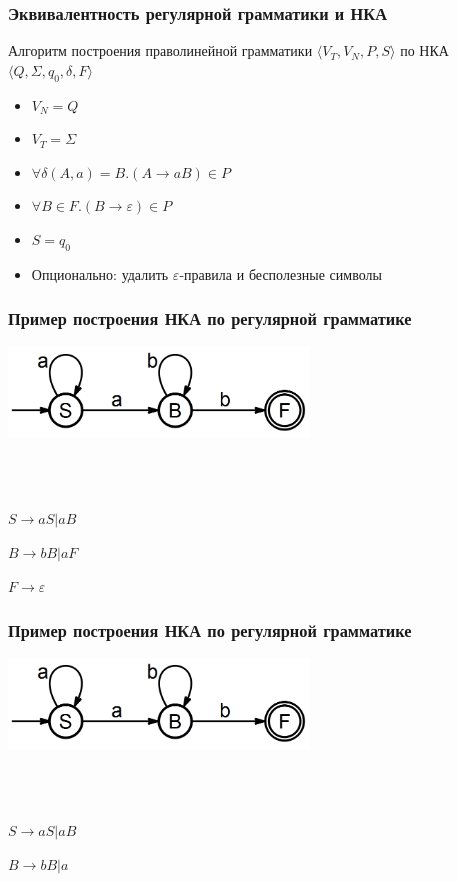 \documentclass{beamer}
\begin{document}
\begin{frame}[fragile]
  \transwipe[direction=90]
  \frametitle{Эквивалентность регулярной грамматики и НКА}
  Алгоритм построения праволинейной грамматики $\langle V_T, V_N, P, S \rangle$ по НКА $\langle Q, \Sigma, q_0, \delta, F \rangle$
  \begin{itemize}
    \item $V_N = Q$
    \item $V_T = \Sigma$
    \item $\forall \delta(A, a) = B . (A \rightarrow a B) \in P$
    \item $\forall B \in F. (B \rightarrow \varepsilon) \in P$
    \item $S = q_0$
    \item Опционально: удалить $\varepsilon$-правила и бесполезные символы
  \end{itemize}
\end{frame}

\begin{frame}[fragile]
  \transwipe[direction=90]
  \frametitle{Пример построения НКА по регулярной грамматике}
  \begin{center}
  \includegraphics[width=0.60\textwidth]{pics/rg_nfa.png} 
  \end{center}
  
  ~\\~
  
   $S \rightarrow aS | aB$
  
  $B \rightarrow bB | aF$
  
  $F \rightarrow \varepsilon$
\end{frame}

\begin{frame}[fragile]
  \transwipe[direction=90]
  \frametitle{Пример построения НКА по регулярной грамматике}
  \begin{center}
  \includegraphics[width=0.60\textwidth]{pics/rg_nfa.png} 
  \end{center}
  
  ~\\~
  
   $S \rightarrow aS | aB$
  
  $B \rightarrow bB | a$
\end{frame}
\end{document}
